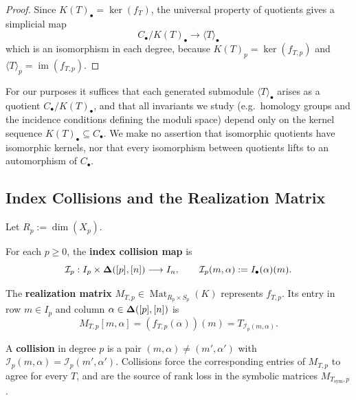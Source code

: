 \begin{proof}
Since $K(T)_\bullet = \ker(f_T)$, the universal property of quotients gives a
simplicial map
\[
C_\bullet/K(T)_\bullet \longrightarrow \langle T\rangle_\bullet
\]
which is an isomorphism in each degree, because $K(T)_p = \ker(f_{T,p})$ and
$\langle T\rangle_p = \operatorname{im}(f_{T,p})$.
\end{proof}




\begin{remark}
For our purposes it suffices that each generated submodule $\langle T\rangle_\bullet$
arises as a quotient $C_\bullet/K(T)_\bullet$, and that all invariants we study
(e.g.\ homology groups and the incidence conditions defining the moduli space)
depend only on the kernel sequence $K(T)_\bullet \subseteq C_\bullet$.
We make no assertion that isomorphic quotients have isomorphic kernels, nor that
every isomorphism between quotients lifts to an automorphism of $C_\bullet$.
\end{remark}



\subsection{Index Collisions and the Realization Matrix}

Let $R_p := \dim(X_p)$.

\begin{definition}\label{def:index_collision_map}
For each $p\ge 0$, the \textbf{index collision map} is
\[
\mathcal{I}_p: I_p \times \boldsymbol{\Delta}([p],[n]) \longrightarrow I_n,
\qquad
\mathcal{I}_p(m, \alpha) := I_\bullet(\alpha)(m).
\]
\end{definition}

\begin{definition}
The \textbf{realization matrix} $M_{T,p} \in \operatorname{Mat}_{R_p\times S_p}(K)$
represents $f_{T,p}$. Its entry in row $m \in I_p$ and column
$\alpha \in \boldsymbol{\Delta}([p],[n])$ is
\[
M_{T,p}[m, \alpha]
= (f_{T,p}(\alpha))(m)
= T_{\mathcal{I}_p(m, \alpha)}.
\]
\end{definition}

A \textbf{collision} in degree $p$ is a pair
$(m,\alpha)\neq (m',\alpha')$ with
$\mathcal{I}_p(m,\alpha)=\mathcal{I}_p(m',\alpha')$.
Collisions force the corresponding entries of $M_{T,p}$ to agree for every
$T$, and are the source of rank loss in the symbolic matrices
$M_{T_{\mathrm{sym}},p}$.


